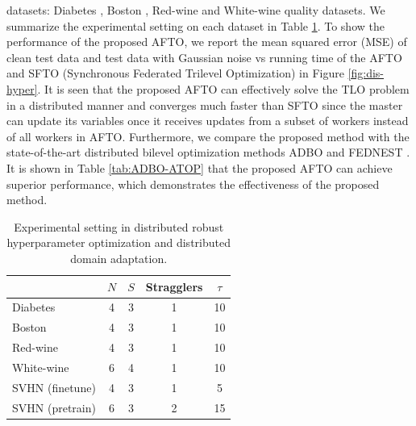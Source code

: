 \documentclass[letterpaper]{article} %
\begin{document}
datasets: Diabetes  \cite{dua2017uci}, Boston  \cite{harrison1978hedonic}, Red-wine and White-wine quality  \cite{cortez2009modeling} datasets. We summarize the experimental setting on each dataset in Table \ref{tab:details_main}. To show the performance of the proposed AFTO, we report the mean squared error (MSE) of clean test data and test data with Gaussian noise vs running time of the AFTO and SFTO (Synchronous Federated Trilevel Optimization) in Figure \ref{fig:dis-hyper}. It is seen that the proposed AFTO can effectively solve the TLO problem in a distributed manner and converges much faster than SFTO since the master can update its variables once it receives updates from a subset of workers instead of all workers in AFTO. Furthermore, we compare the proposed method with the state-of-the-art distributed bilevel optimization methods ADBO \cite{jiao2022asynchronous} and FEDNEST \cite{tarzanagh2022fednest}. It is shown in Table \ref{tab:ADBO-ATOP} that the proposed AFTO can achieve superior performance, which demonstrates the effectiveness of the proposed method.


\renewcommand\arraystretch{1.1}
\renewcommand\tabcolsep{10pt}
\begin{table}[t]
\centering
\renewcommand{\thetable}{\arabic{table}}
{
\begin{tabular}{l|c|c|c|c}
\toprule
& $N$     & $S$ & Stragglers & $\tau$ \\ \hline
Diabetes  & 4  & 3 & 1 & 10 \\
Boston & 4  & 3 & 1  & 10 \\
Red-wine & 4  & 3 & 1 & 10\\
White-wine & 6  & 4 &  1 & 10 \\
SVHN (finetune) & 4  & 3 & 1  & 5 \\
SVHN (pretrain) & 6  & 3 & 2  & 15\\
\bottomrule
\end{tabular}}
\caption{Experimental setting in distributed robust hyperparameter optimization and distributed
domain adaptation.}
\label{tab:details_main}
\end{table}
\end{document}
